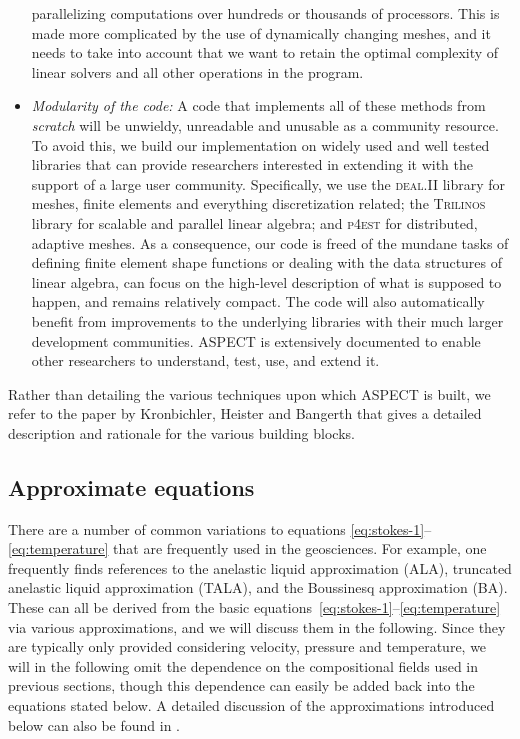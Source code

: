 \documentclass{article}
\newcommand{\dealii}{{\textsc{deal.II}}}
\newcommand{\pfrst}{{\normalfont\textsc{p4est}}}
\newcommand{\trilinos}{{\textsc{Trilinos}}}
\newcommand{\aspect}{\textsc{ASPECT}}
\begin{document}
\begin{itemize}
  parallelizing computations over hundreds or thousands of processors. This is
  made more complicated by the use of dynamically changing meshes, and it
  needs to take into account that we want to retain the optimal complexity of
  linear solvers and all other operations in the program.
\item \textit{Modularity of the code:} A code that implements all of these
  methods from \textit{scratch} will be unwieldy, unreadable and unusable as a community
  resource. To avoid this, we build our implementation on widely used and well
  tested libraries that can provide researchers interested in extending it
  with the support of a large user community. Specifically, we use the
  \dealii{} library \cite{BHK07,BK99m} for meshes, finite
  elements and everything discretization related; the \trilinos{} library
  \cite{trilinos,trilinos-web-page} for scalable and parallel linear algebra;
  and \pfrst{} \cite{p4est} for distributed, adaptive meshes. As a
  consequence, our code is freed of the mundane tasks of defining finite
  element shape functions or dealing with the data structures of linear algebra,
  can focus on the high-level description of what is supposed to happen, and
  remains relatively compact. The code will also
  automatically benefit from improvements to the underlying libraries with
  their much larger development communities. \aspect{} is extensively
  documented to enable other researchers to understand, test, use, and extend it.
\end{itemize}

Rather than detailing the various techniques upon which \aspect{} is built, we
refer to the paper by Kronbichler, Heister and Bangerth \cite{KHB12} that
gives a detailed description and rationale for the various building blocks.


\subsection{Approximate equations}
\label{sec:approximate-equations}

There are a number of common variations to equations
\eqref{eq:stokes-1}--\eqref{eq:temperature} that are frequently used in the
geosciences. For example, one frequently finds references to the anelastic liquid
approximation (ALA), truncated anelastic liquid approximation (TALA), and the
Boussinesq approximation (BA). These can all be derived from the basic
equations~\eqref{eq:stokes-1}--\eqref{eq:temperature} via various approximations, 
and we will discuss them in the following. Since they are typically only provided
considering velocity, pressure and temperature, we will in the following omit
the dependence on the compositional fields used in previous sections, though
this dependence can easily be added back into the equations stated below. A
detailed discussion of the approximations introduced below can also be found in
\cite{KLKLZTTK10}.
\end{document}
